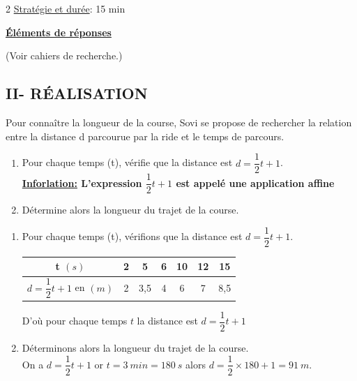 \begin{multicols*}{2}
 	\underline{Stratégie et durée}: 15 min
 	\begin{center}
 		\underline{\textbf{Éléments de réponses}}
 	\end{center}
 	(Voir cahiers de recherche.)
 
 	\begin{center}
 		\section*{II- RÉALISATION}
 	\end{center}
 	\setcounter{sequen}{0}
 	
 	\setcounter{q}{0}
 	
 	Pour connaître la longueur de la course, Sovi se propose de rechercher la relation entre la distance d parcourue par la
 	ride et le temps de parcours.\\
 	\begin{enumerate}
 		\item Pour chaque temps (t), vérifie que la distance est $ d=\dfrac{1}{2}t+1 $.
 		\\ \textbf{\underline{Inforlation:} L'expression $ \dfrac{1}{2}t+1 $ est appelé une application affine}
 		\item Détermine alors la longueur du trajet de la
 		course.
 	\end{enumerate}
 	\dure
 	\resul
 	\begin{enumerate}
 		\item Pour chaque temps (t), vérifions que la distance est $ d=\dfrac{1}{2}t+1 $.\\
 		\hspace*{-1cm}\begin{tabular}{|c|c|c|c|c|c|c|}
 			\hline 
 			t $ (s) $	& 2 & 5 & 6 &  10&12  & 15 \\ 
 			\hline 
 			$ d=\dfrac{1}{2}t+1 $ en $ (m) $	& 2 & 3,5 & 4 & 6 & 7 & 8,5 \\ 
 			\hline 
 		\end{tabular} 
 		
 		D'où pour chaque temps $ t $ la distance est $ d=\dfrac{1}{2}t+1 $
 		\item Déterminons alors la longueur du trajet de la
 		course.\\
 		On a $ d=\dfrac{1}{2}t+1  $ or $ t=3~min=180~s $ alors $ d=\dfrac{1}{2}\times 180+1=91~m$.
 	\end{enumerate}
 	

\end{multicols*}
